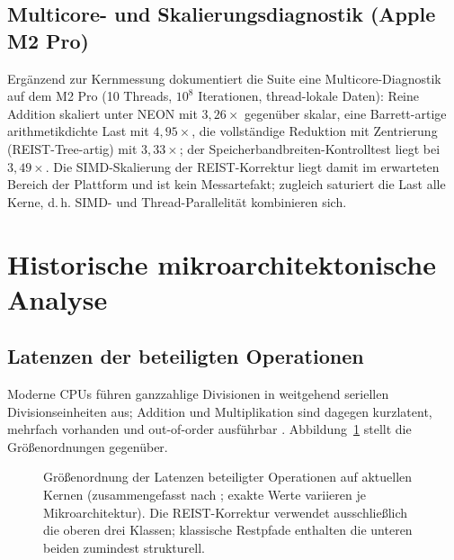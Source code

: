 \documentclass[11pt,a4paper]{scrartcl}
\theoremstyle{definition}
\theoremstyle{plain}
\theoremstyle{remark}
\begin{document}
\subsection{Multicore- und Skalierungsdiagnostik (Apple M2 Pro)}

Ergänzend zur Kernmessung dokumentiert die Suite eine Multicore-Diagnostik auf dem M2 Pro (10 Threads, $10^8$ Iterationen, thread-lokale Daten): Reine Addition skaliert unter NEON mit $3{,}26\times$ gegenüber skalar, eine Barrett-artige arithmetikdichte Last mit $4{,}95\times$, die vollständige Reduktion mit Zentrierung (REIST-Tree-artig) mit $3{,}33\times$; der Speicherbandbreiten-Kontrolltest liegt bei $3{,}49\times$. Die SIMD-Skalierung der REIST-Korrektur liegt damit im erwarteten Bereich der Plattform und ist kein Messartefakt; zugleich saturiert die Last alle Kerne, d.\,h. SIMD- und Thread-Parallelität kombinieren sich.

\section{Historische mikroarchitektonische Analyse}
\label{sec:mikroarchitektur}

\subsection{Latenzen der beteiligten Operationen}

Moderne CPUs führen ganzzahlige Divisionen in weitgehend seriellen Divisionseinheiten aus; Addition und Multiplikation sind dagegen kurzlatent, mehrfach vorhanden und out-of-order ausführbar \cite{fog}. Abbildung~\ref{fig:latenzen} stellt die Größenordnungen gegenüber.

\begin{figure}[htbp]
\centering
{}
\caption{Größenordnung der Latenzen beteiligter Operationen auf aktuellen Kernen (zusammengefasst nach \cite{fog}; exakte Werte variieren je Mikroarchitektur). Die REIST-Korrektur verwendet ausschließlich die oberen drei Klassen; klassische Restpfade enthalten die unteren beiden zumindest strukturell.}
\label{fig:latenzen}
\end{figure}
\end{document}
